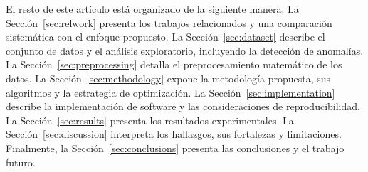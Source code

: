 El resto de este artículo está organizado de la siguiente manera. La
Sección~\ref{sec:relwork} presenta los trabajos relacionados y una comparación
sistemática con el enfoque propuesto. La Sección~\ref{sec:dataset} describe el
conjunto de datos y el análisis exploratorio, incluyendo la detección de
anomalías. La Sección~\ref{sec:preprocessing} detalla el preprocesamiento
matemático de los datos. La Sección~\ref{sec:methodology} expone la metodología
propuesta, sus algoritmos y la estrategia de optimización. La
Sección~\ref{sec:implementation} describe la implementación de software y las
consideraciones de reproducibilidad. La Sección~\ref{sec:results} presenta los
resultados experimentales. La Sección~\ref{sec:discussion} interpreta los hallazgos, sus
fortalezas y limitaciones. Finalmente, la Sección~\ref{sec:conclusions} presenta
las conclusiones y el trabajo futuro.